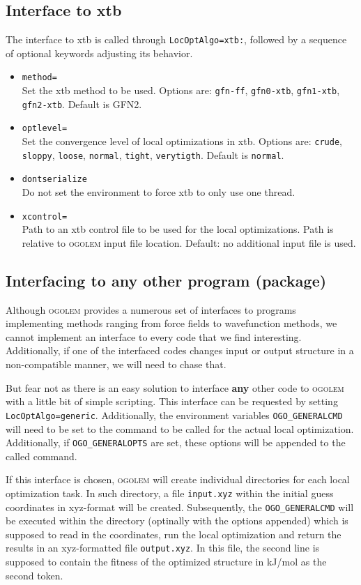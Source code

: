 \documentclass[a4paper,10pt]{scrbook}
\newcommand{\ogo}{\textsc{ogolem}}
\begin{document}
\subsection{Interface to xtb}
The interface to xtb is called through \texttt{LocOptAlgo=xtb:}, followed by a
sequence of optional keywords adjusting its behavior.
\begin{itemize}
\item \texttt{method=}\\ Set the xtb method to be used. Options are: \texttt{gfn-ff},
\texttt{gfn0-xtb}, \texttt{gfn1-xtb}, \texttt{gfn2-xtb}. Default is GFN2.
\item \texttt{optlevel=}\\ Set the convergence level of local optimizations in xtb.
Options are: \texttt{crude}, \texttt{sloppy}, \texttt{loose}, \texttt{normal},
\texttt{tight}, \texttt{verytigth}. Default is \texttt{normal}.
\item \texttt{dontserialize}\\Do not set the environment to force xtb to only use
one thread.
\item \texttt{xcontrol=}\\Path to an xtb control file to be used for the local
optimizations. Path is relative to \ogo{} input file location. Default: no
additional input file is used.
\end{itemize}

\subsection{Interfacing to \textbf{any} other program (package)}
Although \ogo{} provides a numerous set of interfaces to programs implementing
methods ranging from force fields to wavefunction methods, we cannot implement
an interface to every code that we find interesting. Additionally, if one of the
interfaced codes changes input or output structure in a non-compatible manner,
we will need to chase that.

But fear not as there is an easy solution to interface \textbf{any} other code
to \ogo{} with a little bit of simple scripting. This interface can be requested
by setting \texttt{LocOptAlgo=generic}. Additionally, the environment variables
\texttt{OGO\_GENERALCMD} will need to be set to the command to be called for the
actual local optimization. Additionally, if \texttt{OGO\_GENERALOPTS} are set, 
these
options will be appended to the called command.

If this interface is chosen, \ogo{} will create individual directories for each 
local
optimization task. In such directory, a file \texttt{input.xyz} within the 
initial guess
coordinates in xyz-format will be created. Subsequently, the 
\texttt{OGO\_GENERALCMD} will
be executed within the directory (optinally with the options appended) which is 
supposed
to read in the coordinates, run the local optimization and return the results
in an xyz-formatted file \texttt{output.xyz}. In this file, the second line is 
supposed
to contain the fitness of the optimized structure in kJ/mol as the second token.
\end{document}

